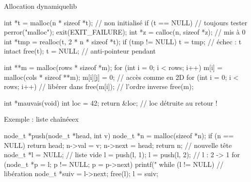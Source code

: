 \documentclass{article}
\begin{document}
\begin{colonne}[mémoire][col-b]
\begin{bloc}{Allocation dynamique}{lib}
\begin{code}
int *t = malloc(n * sizeof *t);   // non initialisé
if (t == NULL) {                  // toujours tester
    perror("malloc");
    exit(EXIT_FAILURE);
}
int *z = calloc(n, sizeof *z);    // mis à 0
int *tmp = realloc(t, 2 * n * sizeof *t);
if (tmp != NULL) t = tmp;         // échec : t intact
free(t);
t = NULL;                         // anti-pointeur pendant
\end{code}
\begin{code}
int **m = malloc(rows * sizeof *m);
for (int i = 0; i < rows; i++)
    m[i] = malloc(cols * sizeof **m);
m[i][j] = 0;                      // accès comme en 2D
for (int i = 0; i < rows; i++)    // libérer dans
    free(m[i]);                   //   l'ordre inverse
free(m);
\end{code}
\begin{code}
int *mauvais(void) {
    int loc = 42;
    return &loc;              // loc détruite au retour !
}
\end{code}
\end{bloc}

\begin{bloc}{Exemple : liste chaînée}{ex}
\begin{code}
node_t *push(node_t *head, int v) {
    node_t *n = malloc(sizeof *n);
    if (n == NULL) return head;
    n->val  = v;
    n->next = head;
    return n;                     // nouvelle tête
}
node_t *l = NULL;                 // liste vide
l = push(l, 1);
l = push(l, 2);                   // l : 2 -> 1
for (node_t *p = l; p != NULL; p = p->next)
    printf("%
while (l != NULL) {               // libération
    node_t *suiv = l->next;
    free(l);
    l = suiv;
}
\end{code}
\end{bloc}
\end{colonne}\colbreak
\end{document}
